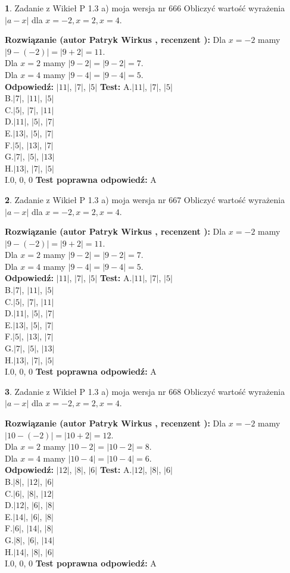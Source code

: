 \documentclass[12pt, a4paper]{article}
\theoremstyle{definition} %
\newtheorem{zad}{}
\newcommand{\zadStart}[1]{\begin{zad}#1\newline}
\newcommand{\zadStop}{\end{zad}}
\newcommand{\rozwStart}[2]{\noindent \textbf{Rozwiązanie (autor #1 , recenzent #2): }\newline}
\newcommand{\rozwStop}{\newline}
\newcommand{\odpStart}{\noindent \textbf{Odpowiedź:}\newline}
\newcommand{\odpStop}{\newline}
\newcommand{\testStart}{\noindent \textbf{Test:}\newline}
\newcommand{\testStop}{\newline}
\newcommand{\kluczStart}{\noindent \textbf{Test poprawna odpowiedź:}\newline}
\newcommand{\kluczStop}{\newline}
\begin{document}
\zadStart{Zadanie z Wikieł P 1.3 a) moja wersja nr 666}
Obliczyć wartość wyrażenia $|a - x|$ dla $x=-2,x=2,x=4$.
\zadStop
\rozwStart{Patryk Wirkus}{}
Dla $x = -2$ mamy $|9 - (-2)| = |9 + 2| = 11$.\\
Dla $x = 2$ mamy $|9 - 2| = |9 - 2| = 7$.\\
Dla $x = 4$ mamy $|9 - 4| = |9 - 4| = 5$.\\
\rozwStop
\odpStart
$|11|$, $|7|$, $|5|$
\odpStop
\testStart
A.$|11|$, $|7|$, $|5|$\\
B.$|7|$, $|11|$, $|5|$\\
C.$|5|$, $|7|$, $|11|$\\
D.$|11|$, $|5|$, $|7|$\\
E.$|13|$, $|5|$, $|7|$\\
F.$|5|$, $|13|$, $|7|$\\
G.$|7|$, $|5|$, $|13|$\\
H.$|13|$, $|7|$, $|5|$\\
I.$0$, $0$, $0$
\testStop
\kluczStart
A
\kluczStop



\zadStart{Zadanie z Wikieł P 1.3 a) moja wersja nr 667}
Obliczyć wartość wyrażenia $|a - x|$ dla $x=-2,x=2,x=4$.
\zadStop
\rozwStart{Patryk Wirkus}{}
Dla $x = -2$ mamy $|9 - (-2)| = |9 + 2| = 11$.\\
Dla $x = 2$ mamy $|9 - 2| = |9 - 2| = 7$.\\
Dla $x = 4$ mamy $|9 - 4| = |9 - 4| = 5$.\\
\rozwStop
\odpStart
$|11|$, $|7|$, $|5|$
\odpStop
\testStart
A.$|11|$, $|7|$, $|5|$\\
B.$|7|$, $|11|$, $|5|$\\
C.$|5|$, $|7|$, $|11|$\\
D.$|11|$, $|5|$, $|7|$\\
E.$|13|$, $|5|$, $|7|$\\
F.$|5|$, $|13|$, $|7|$\\
G.$|7|$, $|5|$, $|13|$\\
H.$|13|$, $|7|$, $|5|$\\
I.$0$, $0$, $0$
\testStop
\kluczStart
A
\kluczStop



\zadStart{Zadanie z Wikieł P 1.3 a) moja wersja nr 668}
Obliczyć wartość wyrażenia $|a - x|$ dla $x=-2,x=2,x=4$.
\zadStop
\rozwStart{Patryk Wirkus}{}
Dla $x = -2$ mamy $|10 - (-2)| = |10 + 2| = 12$.\\
Dla $x = 2$ mamy $|10 - 2| = |10 - 2| = 8$.\\
Dla $x = 4$ mamy $|10 - 4| = |10 - 4| = 6$.\\
\rozwStop
\odpStart
$|12|$, $|8|$, $|6|$
\odpStop
\testStart
A.$|12|$, $|8|$, $|6|$\\
B.$|8|$, $|12|$, $|6|$\\
C.$|6|$, $|8|$, $|12|$\\
D.$|12|$, $|6|$, $|8|$\\
E.$|14|$, $|6|$, $|8|$\\
F.$|6|$, $|14|$, $|8|$\\
G.$|8|$, $|6|$, $|14|$\\
H.$|14|$, $|8|$, $|6|$\\
I.$0$, $0$, $0$
\testStop
\kluczStart
A
\kluczStop
\end{document}
